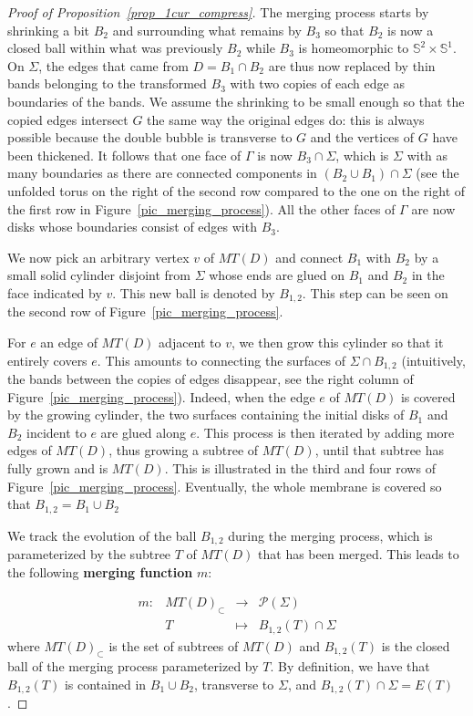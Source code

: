 \documentclass[11pt,a4paper]{article}
\newcommand{\bfdex}[1]{\textbf{#1}\index{#1}}
\begin{document}
\begin{proof}[Proof of Proposition~\ref{prop_1cur_compress}]
The merging process starts by shrinking a bit $B_2$ and surrounding what remains by $B_3$ so that $B_2$ is now a closed ball within what was previously $B_2$ while $B_3$ is homeomorphic to $\mathbb{S}^2 \times \mathbb{S}^1$. 
On $\Sigma$, the edges that came from $D = B_1 \cap B_2$ are thus now replaced by thin bands belonging to the transformed $B_3$ with two copies of each edge as boundaries of the bands. We assume the shrinking to be small enough so that the copied edges intersect $G$ the same way the original edges do: this is always possible because the double bubble is transverse to $G$ and the vertices of $G$ have been thickened. It follows that one face of $\Gamma$ is now $B_3 \cap \Sigma$, which is $\Sigma$ with as many boundaries as there are connected components in $(B_2 \cup B_1) \cap \Sigma$ (see the unfolded torus on the right of the second row compared to the one on the right of the first row in Figure~\ref{pic_merging_process}). All the other faces of $\Gamma$ are now disks whose boundaries consist of edges with $B_3$.

We now pick an arbitrary vertex $v$ of $MT(D)$ and connect $B_1$ with $B_2$ by a small solid cylinder disjoint from $\Sigma$ whose ends are glued on $B_1$ and $B_2$ in the face indicated by $v$. This new ball is denoted by $B_{1,2}$. This step can be seen on the second row of Figure~\ref{pic_merging_process}.

For $e$ an edge of $MT(D)$ adjacent to $v$, we then grow this cylinder so that it entirely covers $e$. This amounts to connecting the surfaces of $\Sigma \cap B_{1,2}$ (intuitively, the bands between the copies of edges disappear, see the right column of Figure~\ref{pic_merging_process}). Indeed, when the edge $e$ of $MT(D)$ is covered by the growing cylinder, the two surfaces containing the initial disks of $B_1$ and $B_2$ incident to $e$ are glued along $e$. This process is then iterated by adding more edges of $MT(D)$, thus growing a subtree of $MT(D)$, until that subtree has fully grown and is $MT(D)$. This is illustrated in the third and four rows of Figure~\ref{pic_merging_process}. Eventually, the whole membrane is covered so that $B_{1,2} = B_1 \cup B_2$

We track the evolution of the ball $B_{1,2}$ during the merging process, which is parameterized by the subtree $T$ of $MT(D)$ that has been merged. This leads to the following \bfdex{merging function} $m$:

\begin{equation*}
\begin{array}{cccl}
m : & MT(D)_{\subset} & \rightarrow & \mathcal{P}(\Sigma)\\
& T & \mapsto & B_{1,2} (T) \cap \Sigma
\end{array}
\end{equation*} 
where $MT(D)_{\subset}$ is the set of subtrees of $MT(D)$ and $B_{1,2}(T)$ is the closed ball of the merging process parameterized by $T$. By definition, we have that $B_{1,2}(T)$ is contained in $B_1 \cup B_2$, transverse to $\Sigma$, and $B_{1,2}(T) \cap \Sigma = E(T)$.


\end{proof}
\end{document}
